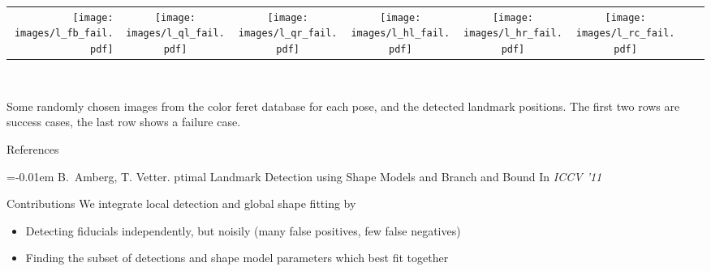\documentclass[landscape,final,a0paper,fontscale=0.27065]{baposter}
\begin{document}
\begin{poster}
\begin{posterbox}[name=results,column=1,span=2,row=0,textborder=none]{}
{\begin{tabular}{@{}rccccccc@{}}
 \parbox[c]{0.11\linewidth}{\texttt{[image: images/l\_fb\_fail.pdf]}} &
 \parbox[c]{0.11\linewidth}{\texttt{[image: images/l\_ql\_fail.pdf]}} &
 \parbox[c]{0.11\linewidth}{\texttt{[image: images/l\_qr\_fail.pdf]}} &
 \parbox[c]{0.11\linewidth}{\texttt{[image: images/l\_hl\_fail.pdf]}} &
 \parbox[c]{0.11\linewidth}{\texttt{[image: images/l\_hr\_fail.pdf]}} &
 \parbox[c]{0.11\linewidth}{\texttt{[image: images/l\_rc\_fail.pdf]}} 
 \end{tabular}
   }\\[-1em]
       \begin{multicols}{2}
 Some randomly chosen images from the color feret database for each
 pose, and the detected landmark positions. The first two rows are success
 cases, the last row shows a failure case. 
       \end{multicols}
 \end{posterbox}
  \begin{posterbox}[name=references,column=0,above=bottom]{References}
    \smaller
    
    \renewcommand{\section}[2]{\vskip 0.05em}
      \begin{thebibliography}{1}\itemsep=-0.01em
      \setlength{\baselineskip}{0.4em}
        B.~Amberg, T. Vetter.
        ptimal {L}andmark {D}etection using {S}hape {M}odels and {B}ranch and {B}ound
        \newblock In {\em ICCV '11}
      \end{thebibliography}
   \vspace{0.3em}
  \end{posterbox}
\begin{posterbox}[name=contribution,column=0,below=problem,above=references]{Contributions}
  We integrate local detection and global shape fitting by
  \begin{itemize}
    \setlength{\itemsep}{0em}
  \item Detecting fiducials independently, but noisily (many false positives, few false negatives)
  \item Finding the subset of detections and shape model parameters which best fit together
  \end{itemize}


\end{posterbox}
\end{poster}
\end{document}
